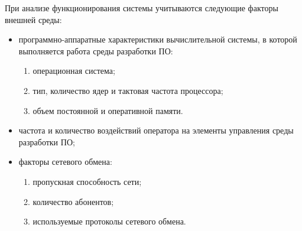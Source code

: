 
При анализе функционирования системы учитываются следующие факторы внешней среды:
\begin{itemize}
    \item программно-аппаратные характеристики вычислительной системы, в которой выполняется работа среды разработки ПО:
        \begin{enumerate}
            \item операционная система;
            \item тип, количество ядер и тактовая частота процессора;
            \item объем постоянной и оперативной памяти.
        \end{enumerate}
    \item частота и количество воздействий оператора на элементы управления среды разработки ПО;
    \item факторы сетевого обмена:
        \begin{enumerate}
            \item пропускная способность сети;
            \item количество абонентов;
            \item используемые протоколы сетевого обмена.
        \end{enumerate}
\end{itemize}